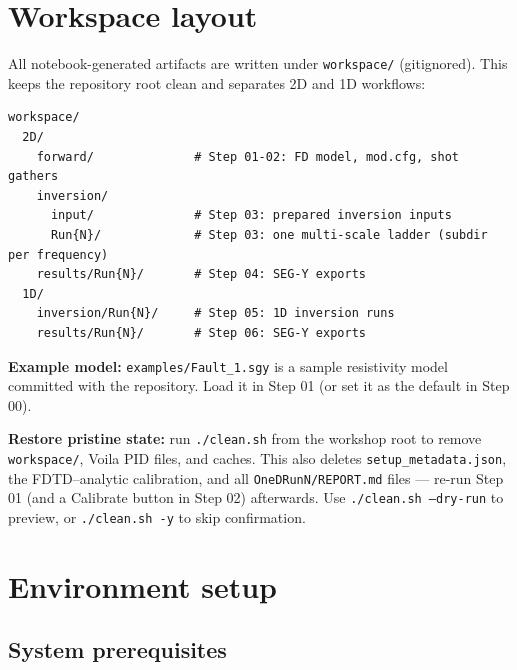 \documentclass[11pt,a4paper]{article}
\begin{document}
\section{Workspace layout}

All notebook-generated artifacts are written under \texttt{workspace/} (gitignored). This keeps the repository root clean and separates 2D and 1D workflows:

\begin{verbatim}
workspace/
  2D/
    forward/              # Step 01-02: FD model, mod.cfg, shot gathers
    inversion/
      input/              # Step 03: prepared inversion inputs
      Run{N}/             # Step 03: one multi-scale ladder (subdir per frequency)
    results/Run{N}/       # Step 04: SEG-Y exports
  1D/
    inversion/Run{N}/     # Step 05: 1D inversion runs
    results/Run{N}/       # Step 06: SEG-Y exports
\end{verbatim}

\textbf{Example model:} \texttt{examples/Fault\_1.sgy} is a sample resistivity model committed with the repository. Load it in Step 01 (or set it as the default in Step 00).

\textbf{Restore pristine state:} run \texttt{./clean.sh} from the workshop root to remove \texttt{workspace/}, Voila PID files, and caches. This also deletes \texttt{setup\_metadata.json}, the FDTD--analytic calibration, and all \texttt{OneDRunN/REPORT.md} files — re-run Step 01 (and a Calibrate button in Step 02) afterwards. Use \texttt{./clean.sh --dry-run} to preview, or \texttt{./clean.sh -y} to skip confirmation.

\section{Environment setup}

\subsection{System prerequisites}
\end{document}
